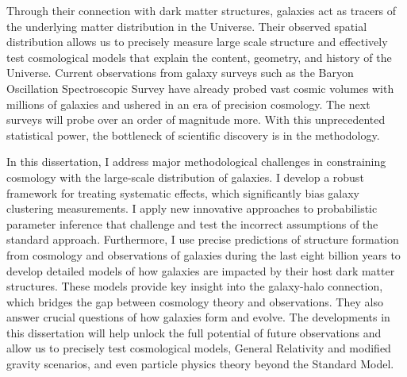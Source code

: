 Through their connection with dark matter structures, galaxies act as 
tracers of the underlying matter distribution in the Universe. Their 
observed spatial distribution allows us to precisely measure large scale 
structure and effectively test cosmological models that explain the content, 
geometry, and history of the Universe. Current observations from galaxy 
surveys such as the Baryon Oscillation Spectroscopic Survey
have already probed vast cosmic volumes with millions of galaxies 
and ushered in an era of precision cosmology. The next surveys will 
probe over an order of magnitude more. With this unprecedented statistical 
power, the bottleneck of scientific discovery is in the methodology.

In this dissertation, I address major methodological challenges in
constraining cosmology with the large-scale distribution of galaxies. 
I develop a robust framework for treating systematic effects, which
significantly bias galaxy clustering measurements. I apply new 
innovative approaches to probabilistic parameter inference that 
challenge and test the incorrect assumptions of the standard approach. 
Furthermore, I use precise predictions of structure formation from
cosmology and observations of galaxies during the last eight billion 
years to develop detailed models of how galaxies are impacted by 
their host dark matter structures. These models provide key 
insight into the galaxy-halo connection, which bridges the gap
between cosmology theory and observations. They also answer crucial 
questions of how galaxies form and evolve. 
The developments in this dissertation will help unlock the full 
potential of future observations and allow us to precisely test 
cosmological models, General Relativity and modified gravity
scenarios, and even particle physics theory beyond the Standard 
Model.  
